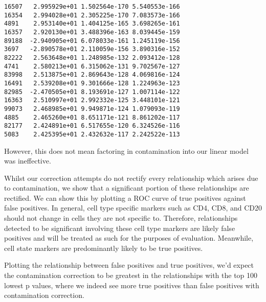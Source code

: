 \documentclass[
  letterpaper,
  DIV=11,
  numbers=noendperiod]{scrreprt}
\begin{document}
\begin{verbatim}
16507   2.995929e+01 1.502564e-170 5.540553e-166
16354   2.994028e+01 2.305225e-170 7.083573e-166
4891    2.953140e+01 1.404125e-165 3.698265e-161
16357   2.920130e+01 3.488396e-163 8.039445e-159
89188  -2.940905e+01 6.078033e-161 1.245119e-156
3697   -2.890578e+01 2.110059e-156 3.890316e-152
82222   2.563648e+01 1.248985e-132 2.093412e-128
4741    2.580213e+01 6.315062e-131 9.702567e-127
83998   2.513875e+01 2.869643e-128 4.069816e-124
16491   2.539208e+01 9.301666e-128 1.224963e-123
82985  -2.470505e+01 8.193691e-127 1.007114e-122
16363   2.510997e+01 2.992332e-125 3.448101e-121
99073   2.468985e+01 9.949871e-124 1.079093e-119
4885    2.465260e+01 8.651171e-121 8.861202e-117
82177   2.424891e+01 6.517655e-120 6.324526e-116
5083    2.425395e+01 2.432632e-117 2.242522e-113
\end{verbatim}

However, this does not mean factoring in contamination into our linear
model was ineffective.

Whilst our correction attempts do not rectify every relationship which
arises due to contamination, we show that a significant portion of these
relationships are rectified. We can show this by plotting a ROC curve of
true positives against false positives. In general, cell type specific
markers such as CD4, CD8, and CD20 should not change in cells they are
not specific to. Therefore, relationships detected to be significant
involving these cell type markers are likely false positives and will be
treated as such for the purposes of evaluation. Meanwhile, cell state
markers are predominantly likely to be true positives.

Plotting the relationship between false positives and true positives,
we'd expect the contamination correction to be greatest in the
relationships with the top 100 lowest p values, where we indeed see more
true positives than false positives with contamination correction.
\end{document}
